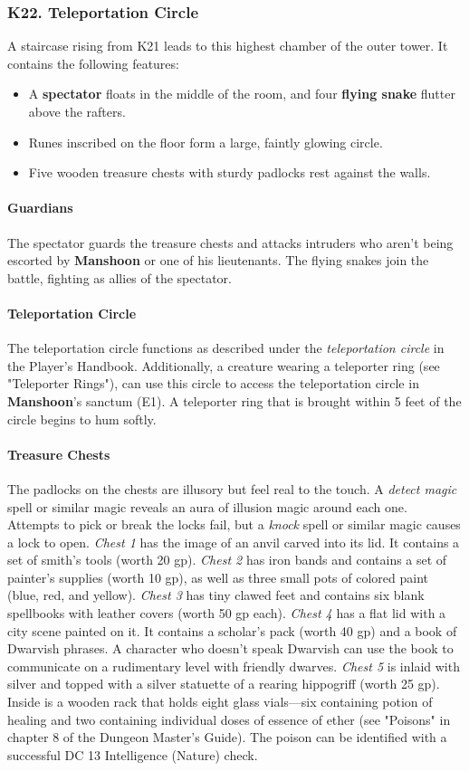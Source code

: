 \documentclass[10pt,a4paper,twoside,twocolumn,openany,nodeprecatedcode]{dndbook}
\begin{document}
\subsubsection{K22. Teleportation Circle}
A staircase rising from K21 leads to this highest chamber of the outer tower. It contains the following features:
\begin{itemize}

\item A \textbf{spectator} floats in the middle of the room, and four \textbf{flying snake} flutter above the rafters.
\item Runes inscribed on the floor form a large, faintly glowing circle.
\item Five wooden treasure chests with sturdy padlocks rest against the walls.
\end{itemize}


\paragraph{Guardians}
The spectator guards the treasure chests and attacks intruders who aren't being escorted by \textbf{Manshoon} or one of his lieutenants. The flying snakes join the battle, fighting as allies of the spectator.
\paragraph{Teleportation Circle}
The teleportation circle functions as described under the \textit{teleportation circle} in the Player's Handbook. Additionally, a creature wearing a teleporter ring (see "Teleporter Rings"), can use this circle to access the teleportation circle in \textbf{Manshoon}'s sanctum (E1). A teleporter ring that is brought within 5 feet of the circle begins to hum softly.
\paragraph{Treasure Chests}
The padlocks on the chests are illusory but feel real to the touch. A \textit{detect magic} spell or similar magic reveals an aura of illusion magic around each one. Attempts to pick or break the locks fail, but a \textit{knock} spell or similar magic causes a lock to open. \textit{Chest 1} has the image of an anvil carved into its lid. It contains a set of smith's tools (worth 20 gp). \textit{Chest 2 } has iron bands and contains a set of painter's supplies (worth 10 gp), as well as three small pots of colored paint (blue, red, and yellow). \textit{Chest 3} has tiny clawed feet and contains six blank spellbooks with leather covers (worth 50 gp each). \textit{Chest 4} has a flat lid with a city scene painted on it. It contains a scholar's pack (worth 40 gp) and a book of Dwarvish phrases. A character who doesn't speak Dwarvish can use the book to communicate on a rudimentary level with friendly dwarves. \textit{Chest 5} is inlaid with silver and topped with a silver statuette of a rearing hippogriff (worth 25 gp). Inside is a wooden rack that holds eight glass vials—six containing potion of healing and two containing individual doses of essence of ether (see "Poisons" in chapter 8 of the Dungeon Master's Guide). The poison can be identified with a successful DC 13 Intelligence (Nature) check.
\end{document}
